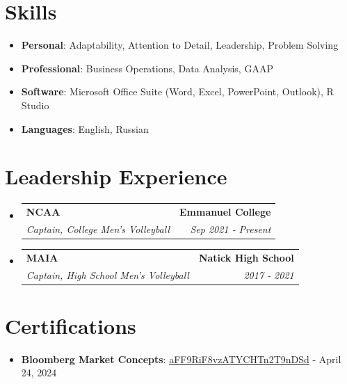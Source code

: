 \documentclass[letterpaper,]{article}
\makeatletter
\newcommand{\resumeItem}[2]{
  \item\small{
    \textbf{#1}{: #2 \vspace{-2pt}}
  }
}
\newcommand{\resumeSubheading}[4]{
  \vspace{-1pt}\item
    \begin{tabular*}{0.97\textwidth}[t]{l@{\extracolsep{\fill}}r}
      \textbf{#1} & #2 \\
      \textit{\small#3} & \textit{\small #4} \\
    \end{tabular*}
    \vspace{-5pt}
}
\newcommand{\resumeSubItem}[2]{\resumeItem{#1}{#2}\vspace{-4pt}}
\newcommand{\resumeSubHeadingListStart}{\begin{itemize}[leftmargin=*]}
\newcommand{\resumeSubHeadingListEnd}{\end{itemize}}
\makeatother
\begin{document}
\section{Skills}
  \resumeSubHeadingListStart
    
      \resumeSubItem{Personal}
        {Adaptability, Attention to Detail, Leadership, Problem Solving}
    
      \resumeSubItem{Professional}
        {Business Operations, Data Analysis, GAAP}

      \resumeSubItem{Software}
        {Microsoft Office Suite (Word, Excel, PowerPoint, Outlook), R Studio}
    
      \resumeSubItem{Languages}
        {English, Russian}

  \resumeSubHeadingListEnd
  
\section{Leadership Experience}
  \resumeSubHeadingListStart



    \resumeSubheading
      {NCAA}{\textbf {Emmanuel College}}
      {Captain, College Men's Volleyball}{Sep 2021 ‑ Present}

    \resumeSubheading
      {MAIA}{\textbf {Natick High School}}
      {Captain, High School Men's Volleyball}{2017 ‑ 2021}
    
  \resumeSubHeadingListEnd

\section{Certifications}

\resumeSubHeadingListStart
  \resumeSubItem{Bloomberg Market Concepts}
    {\href{https://portal.bloombergforeducation.com/certificates/aFF9RiF8vzATYCHTn2T9nDSd?fbclid=IwZXh0bgNhZW0CMTAAAR3-ujvQXxlrKKokvqcgeqzs4V5ppb-BhxnKoYus3PhcME4UJuSOAG2uvWk_aem_AZUypaVosUCKcX8Ps1ObZDUmYhYC6dA8jnRW6RfXXnHdNkYlZC0t_Etc4ewy5XklgO_EDGN7VuiNMd-jd7LSAhzj}{aFF9RiF8vzATYCHTn2T9nDSd}} - {{April 24, 2024}}
\resumeSubHeadingListEnd
\end{document}
